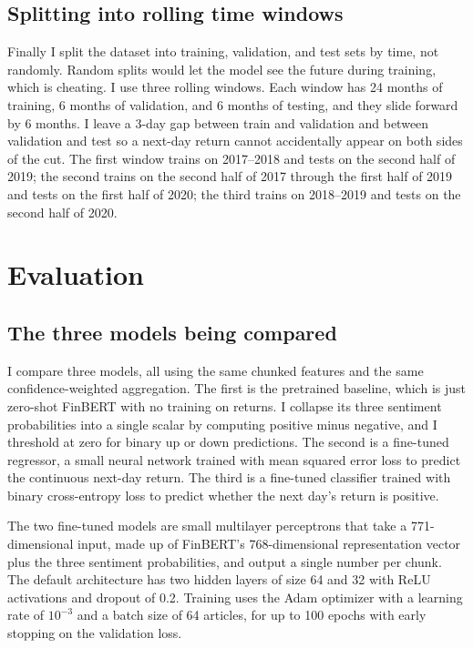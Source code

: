 \documentclass[11pt]{article}
\begin{document}
\subsection{Splitting into rolling time windows}

Finally I split the dataset into training, validation, and test sets by time, not randomly. Random splits would let the model see the future during training, which is cheating. I use three rolling windows. Each window has 24 months of training, 6 months of validation, and 6 months of testing, and they slide forward by 6 months. I leave a 3-day gap between train and validation and between validation and test so a next-day return cannot accidentally appear on both sides of the cut. The first window trains on 2017--2018 and tests on the second half of 2019; the second trains on the second half of 2017 through the first half of 2019 and tests on the first half of 2020; the third trains on 2018--2019 and tests on the second half of 2020.

\section{Evaluation}

\subsection{The three models being compared}

I compare three models, all using the same chunked features and the same confidence-weighted aggregation. The first is the pretrained baseline, which is just zero-shot FinBERT with no training on returns. I collapse its three sentiment probabilities into a single scalar by computing positive minus negative, and I threshold at zero for binary up or down predictions. The second is a fine-tuned regressor, a small neural network trained with mean squared error loss to predict the continuous next-day return. The third is a fine-tuned classifier trained with binary cross-entropy loss to predict whether the next day's return is positive.

The two fine-tuned models are small multilayer perceptrons that take a 771-dimensional input, made up of FinBERT's 768-dimensional representation vector plus the three sentiment probabilities, and output a single number per chunk. The default architecture has two hidden layers of size 64 and 32 with ReLU activations and dropout of 0.2. Training uses the Adam optimizer with a learning rate of $10^{-3}$ and a batch size of 64 articles, for up to 100 epochs with early stopping on the validation loss.
\end{document}
